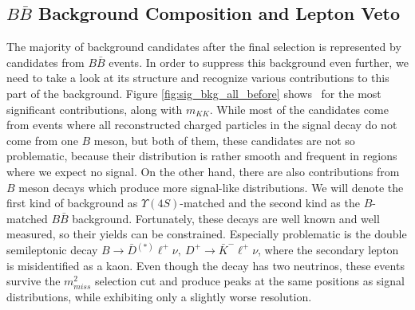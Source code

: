 \subsection{\texorpdfstring{$B \bar B$}{BB-bar} Background Composition and Lepton Veto}

The majority of background candidates after the final selection is represented by candidates from $B \bar B$ events. In order to suppress this background even further, we need to take a look at its structure and recognize various contributions to this part of the background. Figure \ref{fig:sig_bkg_all_before} shows \vars~for the most significant contributions, along with $m_{KK}$. While most of the candidates come from events where all reconstructed charged particles in the signal decay do not come from one $B$ meson, but both of them, these candidates are not so problematic, because their distribution is rather smooth and frequent in regions where we expect no signal. On the other hand, there are also contributions from $B$ meson decays which produce more signal-like distributions. We will denote the first kind of background as $\Upsilon(4S)$-matched and the second kind as the $B$-matched $B \bar B$ background. Fortunately, these decays are well known and well measured, so their yields can be constrained. Especially problematic is the double semileptonic decay $B \to \bar D {}^{(*)} \ell^+ \nu,~D^+ \to \bar K^- \ell^+ \nu$, where the secondary lepton is misidentified as a kaon. Even though the decay has two neutrinos, these events survive the $m_{miss}^2$ selection cut and produce peaks at the same positions as signal distributions, while exhibiting only a slightly worse resolution. 

